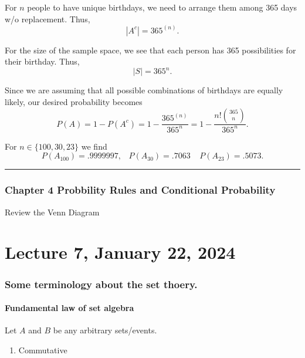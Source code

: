 \documentclass[
]{book}
\providecommand{\tightlist}{%
  \setlength{\itemsep}{0pt}\setlength{\parskip}{0pt}}
\theoremstyle{definition}
\theoremstyle{definition}
\theoremstyle{definition}
\theoremstyle{definition}
\theoremstyle{remark}
\begin{document}
For \(n\) people to have unique birthdays, we need to arrange them among 365 days w/o replacement. Thus,
\[|A^c| = 365^{(n)}.\]

For the size of the sample space, we see that each person has 365 possibilities for their birthday. Thus,
\[|S| = 365^n.\]

Since we are assuming that all possible combinations of birthdays are equally likely, our desired probability becomes
\[
P(A) = 1 - P(A^c) = 1 - \frac{365^{(n)}}{365^n} = 1 - \frac{n! {365 \choose n}}{365^n}.
\]

For \(n\in\{100, 30, 23\}\) we find
\[P(A_{100})= .9999997,\;\;\; P(A_{30})=.7063 \;\;\;\; P(A_{23})=.5073.\]

\begin{center}\rule{0.5\linewidth}{0.5pt}\end{center}

\hypertarget{chapter-4-probbility-rules-and-conditional-probability}{%
\subsection{Chapter 4 Probbility Rules and Conditional Probability}\label{chapter-4-probbility-rules-and-conditional-probability}}

Review the Venn Diagram

\hypertarget{lecture-7-january-22-2024}{%
\chapter{Lecture 7, January 22, 2024}\label{lecture-7-january-22-2024}}

\hypertarget{some-terminology-about-the-set-thoery.}{%
\subsection{Some terminology about the set thoery.}\label{some-terminology-about-the-set-thoery.}}

\hypertarget{fundamental-law-of-set-algebra}{%
\subsubsection{Fundamental law of set algebra}\label{fundamental-law-of-set-algebra}}

Let \(A\) and \(B\) be any arbitrary sets/events.

\begin{enumerate}
\def\labelenumi{\arabic{enumi}.}
\tightlist
\item
  Commutative
\end{enumerate}
\end{document}
